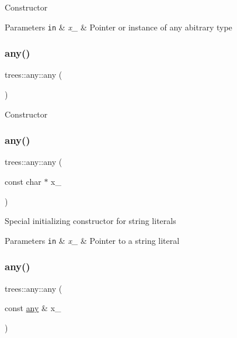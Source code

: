 Constructor


\begin{DoxyParams}[1]{Parameters}
\mbox{\tt in}  & {\em x\+\_\+} & Pointer or instance of any abitrary type \\
\hline
\end{DoxyParams}
\mbox{\label{classtrees_1_1any_a1427bfdf982490592ad0589bd16e9873}} 
\subsubsection{\texorpdfstring{any()}{any()}\hspace{0.1cm}{\footnotesize\ttfamily [2/4]}}
{\footnotesize\ttfamily trees\+::any\+::any (\begin{DoxyParamCaption}{ }\end{DoxyParamCaption})\hspace{0.3cm}{\ttfamily [inline]}}

Constructor \mbox{\label{classtrees_1_1any_ad788f1e315b3c165066da62204e897d5}} 
\subsubsection{\texorpdfstring{any()}{any()}\hspace{0.1cm}{\footnotesize\ttfamily [3/4]}}
{\footnotesize\ttfamily trees\+::any\+::any (\begin{DoxyParamCaption}\item[{const char $\ast$}]{x\+\_\+ }\end{DoxyParamCaption})\hspace{0.3cm}{\ttfamily [inline]}}

Special initializing constructor for string literals


\begin{DoxyParams}[1]{Parameters}
\mbox{\tt in}  & {\em x\+\_\+} & Pointer to a string literal \\
\hline
\end{DoxyParams}
\mbox{\label{classtrees_1_1any_a4bf7cafb65d0ac435cd955eed3c63d40}} 
\subsubsection{\texorpdfstring{any()}{any()}\hspace{0.1cm}{\footnotesize\ttfamily [4/4]}}
{\footnotesize\ttfamily trees\+::any\+::any (\begin{DoxyParamCaption}\item[{const \hyperlink{classtrees_1_1any}{any} \&}]{x\+\_\+ }\end{DoxyParamCaption})\hspace{0.3cm}{\ttfamily [inline]}}

